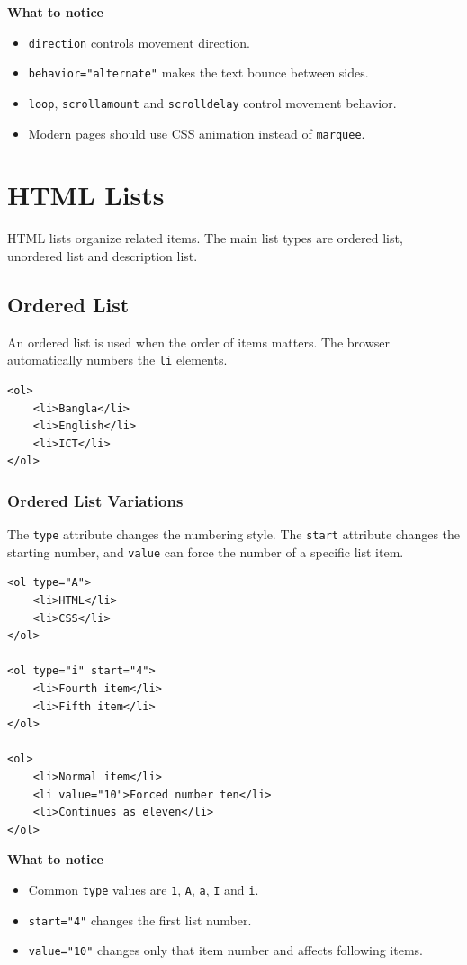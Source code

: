 \textbf{What to notice}
\begin{itemize}
    \item \texttt{direction} controls movement direction.
    \item \texttt{behavior="alternate"} makes the text bounce between sides.
    \item \texttt{loop}, \texttt{scrollamount} and \texttt{scrolldelay} control movement behavior.
    \item Modern pages should use CSS animation instead of \texttt{marquee}.
\end{itemize}

\section{HTML Lists}
HTML lists organize related items. The main list types are ordered list, unordered list and description list.

\subsection{Ordered List}
An ordered list is used when the order of items matters. The browser automatically numbers the \texttt{li} elements.

\begin{lstlisting}[style=htmlide, caption={Ordered List}]
<ol>
    <li>Bangla</li>
    <li>English</li>
    <li>ICT</li>
</ol>
\end{lstlisting}

\subsubsection{Ordered List Variations}
The \texttt{type} attribute changes the numbering style. The \texttt{start} attribute changes the starting number, and \texttt{value} can force the number of a specific list item.

\begin{lstlisting}[style=htmlide, caption={Ordered List Type and Start}]
<ol type="A">
    <li>HTML</li>
    <li>CSS</li>
</ol>

<ol type="i" start="4">
    <li>Fourth item</li>
    <li>Fifth item</li>
</ol>

<ol>
    <li>Normal item</li>
    <li value="10">Forced number ten</li>
    <li>Continues as eleven</li>
</ol>
\end{lstlisting}

\textbf{What to notice}
\begin{itemize}
    \item Common \texttt{type} values are \texttt{1}, \texttt{A}, \texttt{a}, \texttt{I} and \texttt{i}.
    \item \texttt{start="4"} changes the first list number.
    \item \texttt{value="10"} changes only that item number and affects following items.
\end{itemize}

